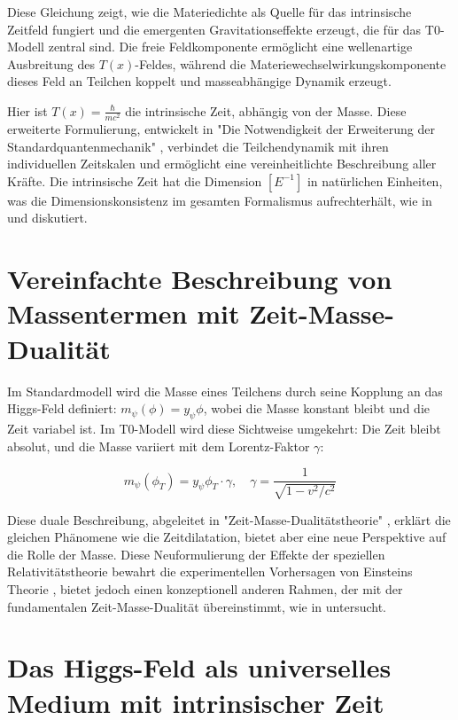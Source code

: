 \documentclass[a4paper,12pt]{article}
\newcommand{\Tfield}{T(x)}
\begin{document}
	Diese Gleichung zeigt, wie die Materiedichte als Quelle für das intrinsische Zeitfeld fungiert und die emergenten Gravitationseffekte erzeugt, die für das T0-Modell zentral sind. Die freie Feldkomponente ermöglicht eine wellenartige Ausbreitung des \(\Tfield\)-Feldes, während die Materiewechselwirkungskomponente dieses Feld an Teilchen koppelt und masseabhängige Dynamik erzeugt.
	
	Hier ist \(\Tfield = \frac{\hbar}{m c^2}\) die intrinsische Zeit, abhängig von der Masse. Diese erweiterte Formulierung, entwickelt in "Die Notwendigkeit der Erweiterung der Standardquantenmechanik" \cite{pascher_erweiterung_2025}, verbindet die Teilchendynamik mit ihren individuellen Zeitskalen und ermöglicht eine vereinheitlichte Beschreibung aller Kräfte. Die intrinsische Zeit hat die Dimension \([E^{-1}]\) in natürlichen Einheiten, was die Dimensionskonsistenz im gesamten Formalismus aufrechterhält, wie in \cite{pascher_alpha_2025} und \cite{pascher_alphabeta_2025} diskutiert.
	\section{Vereinfachte Beschreibung von Massentermen mit Zeit-Masse-Dualität}
	
	Im Standardmodell wird die Masse eines Teilchens durch seine Kopplung an das Higgs-Feld definiert: \(m_\psi(\phi) = y_\psi \phi\), wobei die Masse konstant bleibt und die Zeit variabel ist. Im T0-Modell wird diese Sichtweise umgekehrt: Die Zeit bleibt absolut, und die Masse variiert mit dem Lorentz-Faktor \(\gamma\):
	
	\begin{equation}
		m_\psi(\phi_T) = y_\psi \phi_T \cdot \gamma, \quad \gamma = \frac{1}{\sqrt{1 - v^2/c^2}}
	\end{equation}
	
	Diese duale Beschreibung, abgeleitet in "Zeit-Masse-Dualitätstheorie" \cite{pascher_params_2025}, erklärt die gleichen Phänomene wie die Zeitdilatation, bietet aber eine neue Perspektive auf die Rolle der Masse. Diese Neuformulierung der Effekte der speziellen Relativitätstheorie bewahrt die experimentellen Vorhersagen von Einsteins Theorie \cite{einstein1905}, bietet jedoch einen konzeptionell anderen Rahmen, der mit der fundamentalen Zeit-Masse-Dualität übereinstimmt, wie in \cite{pascher_zeit_masse_2025} untersucht.
	
	\section{Das Higgs-Feld als universelles Medium mit intrinsischer Zeit}
	
\end{document}
